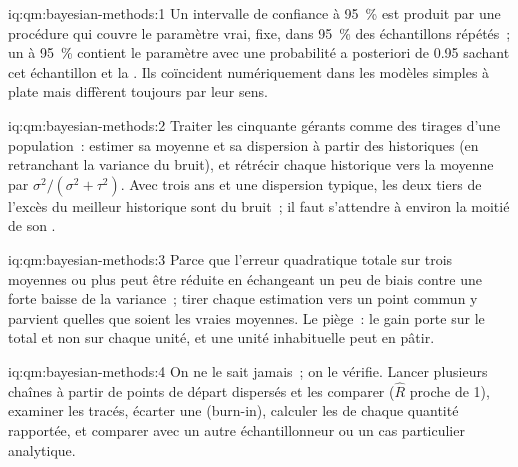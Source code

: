 \begin{solution}{iq:qm:bayesian-methods:1}
Un intervalle de confiance à 95~\% est produit par une procédure qui couvre le paramètre vrai, fixe, dans 95~\% des échantillons répétés~; un  à 95~\%
contient le paramètre avec une probabilité a posteriori de 0.95 sachant cet échantillon et la . Ils coïncident numériquement dans les modèles simples à  plate
mais diffèrent toujours par leur sens.
\end{solution}

\begin{solution}{iq:qm:bayesian-methods:2}
Traiter les cinquante gérants comme des tirages d'une population~: estimer sa moyenne et sa dispersion à partir des historiques (en retranchant la variance du bruit), et rétrécir
chaque historique vers la moyenne par $\sigma^2/(\sigma^2 + \tau^2)$. Avec trois ans et une dispersion typique, les deux tiers de l'excès du meilleur historique
sont du bruit~; il faut s'attendre à environ la moitié de son .
\end{solution}

\begin{solution}{iq:qm:bayesian-methods:3}
Parce que l'erreur quadratique totale sur trois moyennes ou plus peut être réduite en échangeant un peu de biais contre une forte baisse de la variance~; tirer chaque
estimation vers un point commun y parvient quelles que soient les vraies moyennes. Le piège~: le gain porte sur le total et non sur chaque unité, et une
unité inhabituelle peut en pâtir.
\end{solution}

\begin{solution}{iq:qm:bayesian-methods:4}
On ne le sait jamais~; on le vérifie. Lancer plusieurs chaînes à partir de points de départ dispersés et les comparer ($\hat R$ proche de 1), examiner les tracés, écarter une
 (burn-in), calculer les  de chaque quantité rapportée, et comparer avec un autre échantillonneur ou un cas particulier analytique.
\end{solution}

